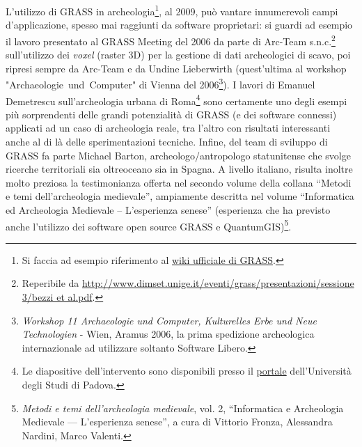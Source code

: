 	L'utilizzo di GRASS in archeologia\footnote{Si faccia ad esempio riferimento al \href{http://grass.osgeo.org/wiki/Archeology}{wiki ufficiale di GRASS}.}, al 2009, può vantare innumerevoli campi d'applicazione, spesso mai raggiunti da software proprietari: si guardi ad esempio il lavoro presentato al GRASS Meeting del 2006 da parte di Arc-Team s.n.c.\footnote{Reperibile da \href{file:http://www.dimset.unige.it/eventi/grass/presentazioni/sessione 3/bezzi et al.pdf}{http://www.dimset.unige.it/eventi/grass/presentazioni/sessione 3/bezzi et al.pdf}.} sull'utilizzo dei \emph{voxel} (raster 3D) per la gestione di dati archeologici di scavo, poi ripresi sempre da Arc-Team e da Undine Lieberwirth (quest'ultima al workshop "Archaeologie~und~Computer" di Vienna del 2006\footnote{\emph{Workshop 11 Archaeologie und Computer, Kulturelles Erbe und Neue Technologien} - Wien, Aramus 2006, la prima spedizione archeologica internazionale ad utilizzare soltanto Software Libero.}). I lavori di Emanuel Demetrescu sull'archeologia urbana di Roma\footnote{Le diapositive dell'intervento sono disponibili presso il \href{file:http://www.perseo.lettere.unipd.it/workshop08/lib/exe/fetch.php?id=download&cache=cache&media=workshop08:documenti:demetrescu_lic.odp}{portale} dell'Università degli Studi di Padova.} sono certamente uno degli esempi più sorprendenti delle grandi potenzialità di GRASS (e dei software connessi) applicati ad un caso di archeologia reale, tra l'altro con risultati interessanti anche al di là delle sperimentazioni tecniche. Infine, del team di sviluppo di GRASS fa parte Michael Barton, archeologo/antropologo statunitense che svolge ricerche territoriali sia oltreoceano sia in Spagna. A livello italiano, risulta inoltre molto preziosa la testimonianza offerta nel secondo volume della collana ``Metodi e temi dell'archeologia medievale'', ampiamente descritta nel volume ``Informatica ed Archeologia Medievale -- L'esperienza senese'' (esperienza che ha previsto anche l'utilizzo dei software open source GRASS e QuantumGIS)\footnote{\emph{Metodi e temi dell'archeologia medievale}, vol. 2, ``Informatica e Archeologia Medievale --- L'esperienza senese'', a cura di Vittorio Fronza, Alessandra Nardini, Marco Valenti.}.\\

